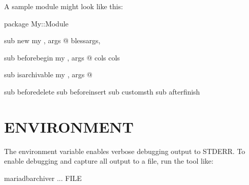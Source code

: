 \documentclass[letterpaper,10pt,english]{sphinxmanual}
\begin{document}
\sphinxAtStartPar
A sample module might look like this:

\begin{sphinxVerbatim}[commandchars=\\\{\}]
package My::Module

sub new 
   my  , \PYGZpc{}args   @\PYGZus{}
    blessargs, 

sub before\PYGZus{}begin 
   my  , \PYGZpc{}args   @\PYGZus{}
   \PYGZhy{}\PYGZgt{}cols  cols

sub is\PYGZus{}archivable 
   my  , \PYGZpc{}args   @\PYGZus{}
    

sub before\PYGZus{}delete  
sub before\PYGZus{}insert  
sub custom\PYGZus{}sth     
sub after\PYGZus{}finish   

\end{sphinxVerbatim}


\section{ENVIRONMENT}
\label{\detokenize{mariadb-archiver:environment}}
\sphinxAtStartPar
The environment variable  enables verbose debugging output to STDERR.
To enable debugging and capture all output to a file, run the tool like:

\begin{sphinxVerbatim}[commandchars=\\\{\}]
 mariadb\PYGZhy{}archiver ... \PYGZgt{} FILE \PYGZgt{}
\end{sphinxVerbatim}
\end{document}
